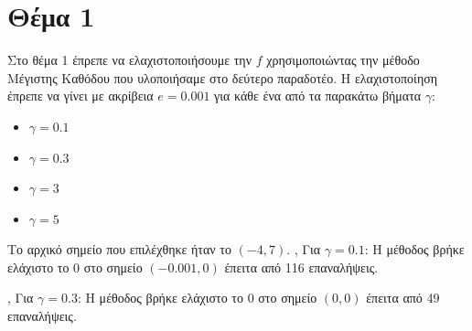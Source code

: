 \chapter{Θέμα 1}
\label{ch:exc1}
Στο θέμα 1 έπρεπε να ελαχιστοποιήσουμε την $f$ χρησιμοποιώντας την μέθοδο Μέγιστης Καθόδου που υλοποιήσαμε στο δεύτερο παραδοτέο. Η ελαχιστοποίηση έπρεπε να γίνει με ακρίβεια $e = 0.001$ για κάθε ένα από τα παρακάτω βήματα $\gamma$:
\begin{itemize}
    \item $\gamma = 0.1$
    \item $\gamma = 0.3$
    \item $\gamma = 3$
    \item $\gamma = 5$
\end{itemize}
Το αρχικό σημείο που επιλέχθηκε ήταν το $(-4, 7)$.
\sep
Για $\gamma = 0.1$:\newline
Η μέθοδος βρήκε ελάχιστο το $0$ στο σημείο $(-0.001, 0)$ έπειτα από 116 επαναλήψεις.
\begin{figure}[!h]
    \centering
    \hfill
\end{figure}
\sep
Για $\gamma = 0.3$:\newline
Η μέθοδος βρήκε ελάχιστο το $0$ στο σημείο $(0, 0)$ έπειτα από 49 επαναλήψεις.
